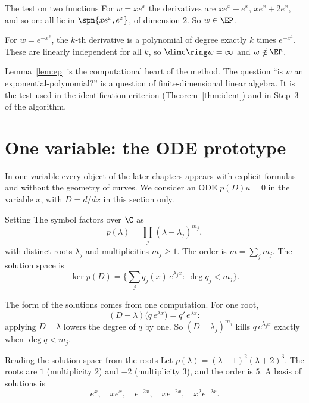 \begin{example}{The test on two functions}
For $w=xe^{x}$ the derivatives are $xe^x+e^x$, $xe^x+2e^x$, and so on: all lie in $\spn\{xe^x,e^x\}$, of dimension $2$. So $w\in\EP$.

For $w=e^{-x^2}$, the $k$-th derivative is a polynomial of degree exactly $k$ times $e^{-x^2}$. These are linearly independent for all $k$, so $\dimc\ring w=\infty$ and $w\notin\EP$.
\end{example}

\begin{takeaway}
Lemma~\ref{lem:ep} is the computational heart of the method. The question ``is $w$ an exponential-polynomial?'' is a question of finite-dimensional linear algebra. It is the test used in the identification criterion (Theorem~\ref{thm:ident}) and in Step~3 of the algorithm.
\end{takeaway}

\section{One variable: the ODE prototype}\label{sec:ode}

In one variable every object of the later chapters appears with explicit formulas and without the geometry of curves. We consider an ODE $p(D)u=0$ in the variable $x$, with $D=d/dx$ in this section only.

\begin{notebox}{Setting}
The symbol factors over $\C$ as
\[
p(\lambda)=\prod_j(\lambda-\lambda_j)^{m_j},
\]
with distinct roots $\lambda_j$ and multiplicities $m_j\ge1$. The order is $m=\sum_jm_j$. The solution space is
\[
\ker p(D)=\Big\{\sum_jq_j(x)\,e^{\lambda_jx}:\ \deg q_j<m_j\Big\}.
\]
\end{notebox}

The form of the solutions comes from one computation. For one root,
\[
(D-\lambda)\big(q\,e^{\lambda x}\big)=q'\,e^{\lambda x}:
\]
applying $D-\lambda$ lowers the degree of $q$ by one. So $(D-\lambda_j)^{m_j}$ kills $q\,e^{\lambda_jx}$ exactly when $\deg q<m_j$.

\begin{example}{Reading the solution space from the roots}
Let $p(\lambda)=(\lambda-1)^2(\lambda+2)^3$. The roots are $1$ (multiplicity $2$) and $-2$ (multiplicity $3$), and the order is $5$. A basis of solutions is
\[
e^{x},\quad xe^{x},\quad e^{-2x},\quad xe^{-2x},\quad x^2e^{-2x}.
\]
\end{example}


